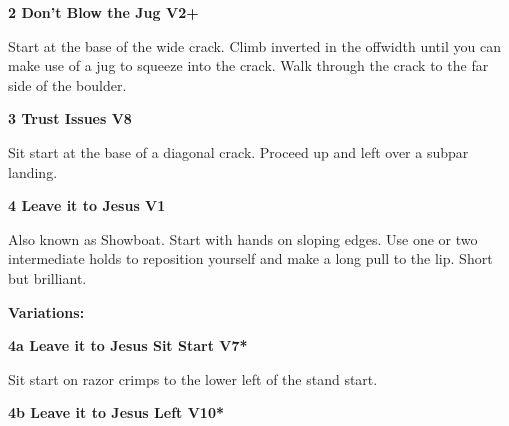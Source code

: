 \begin{multicols}{2}
			
			
			\needspace{1.5cm}
\label{rt:Don't Blow the Jug}
\colorbox{green!20}{
\parbox{0.95\linewidth}{
\textbf{
2 Don't Blow the Jug V2+  \warn
}}}

			\begin{adjustwidth}{0.5cm}{}			
			Start at the base of the wide crack. Climb inverted in the offwidth until you can make use of a jug to squeeze into the crack. Walk through the crack to the far side of the boulder.
			\end{adjustwidth}
			
			
			
			\needspace{1.5cm}
\label{rt:Trust Issues}
\colorbox{Goldenrod!50}{
\parbox{0.95\linewidth}{
\textbf{
3 Trust Issues V8  \warn\warn
}}}

			\begin{adjustwidth}{0.5cm}{}			
			Sit start at the base of a diagonal crack. Proceed up and left over a subpar landing.
			\end{adjustwidth}
			
			
			
			\needspace{1.5cm}
\label{rt:Leave it to Jesus}
\colorbox{green!20}{
\parbox{0.95\linewidth}{
\textbf{
4 Leave it to Jesus V1  
}}}

			\begin{adjustwidth}{0.5cm}{}			
			Also known as Showboat. Start with hands on sloping edges. Use one or two intermediate holds to reposition yourself and make a long pull to the lip. Short but brilliant.
			\end{adjustwidth}
			
				\begin{adjustwidth}{0.5cm}{}				
				\needspace{3cm}
				\textbf{Variations:} \newline
					
					\needspace{1.5cm}
\label{vr:Leave it to Jesus Sit Start}
\colorbox{Goldenrod!50}{
\parbox{0.95\linewidth}{
\textbf{
4a Leave it to Jesus Sit Start V7*  
}}}

					\begin{adjustwidth}{0.5cm}{}			
					Sit start on razor crimps to the lower left of the stand start.
					\end{adjustwidth}
					
					
					
					\needspace{1.5cm}
\label{vr:Leave it to Jesus Left}
\colorbox{red!20}{
\parbox{0.95\linewidth}{
\textbf{
4b Leave it to Jesus Left V10*  
}}}


\end{adjustwidth}
\end{multicols}
